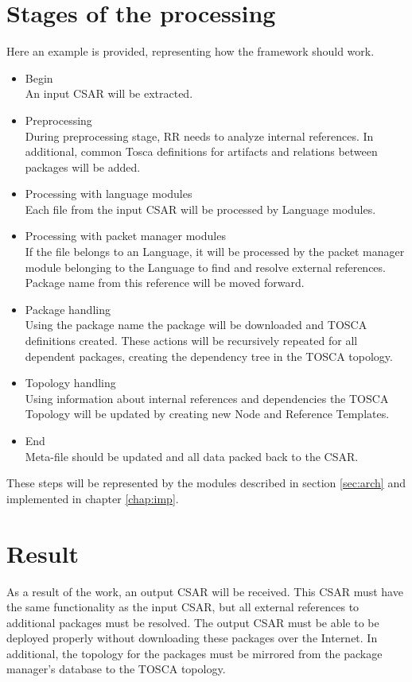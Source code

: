 \section*{Stages of the processing}
Here an example is provided, representing how the framework should work.
\begin{itemize}  
	\item Begin  \\
	An input CSAR will be extracted.
	\item Preprocessing\\
	During preprocessing stage, RR needs to analyze internal references.
	In additional, common Tosca definitions for artifacts and relations between packages will be added.
	\item Processing with language modules\\
	Each file from the input CSAR will be processed by Language modules.
	\item Processing with packet manager modules\\
    If the file belongs to an Language, it will be processed by the packet manager module belonging to the Language to find and resolve external references.
    Package name from this reference will be moved forward.
	\item Package handling\\
	Using the package name the package will be downloaded and TOSCA definitions created. These actions will be recursively repeated for all dependent packages, creating the dependency tree in the TOSCA topology.
	\item Topology handling\\
	Using information about internal references and dependencies the TOSCA Topology will be updated by creating new Node and Reference Templates. 
	\item End\\
	Meta-file should be updated and all data packed back to the CSAR.
\end{itemize}
These steps will be represented by the modules described in section \ref{sec:arch} and implemented in chapter \ref{chap:imp}.

\section*{Result}
As a result of the work, an output CSAR will be received. 
This CSAR must have the same functionality as the input CSAR, but all external references to additional packages must be resolved.
The output CSAR must be able to be deployed properly without downloading these packages over the Internet. 
In additional, the topology for the packages must be mirrored from the package manager's database to the TOSCA topology.